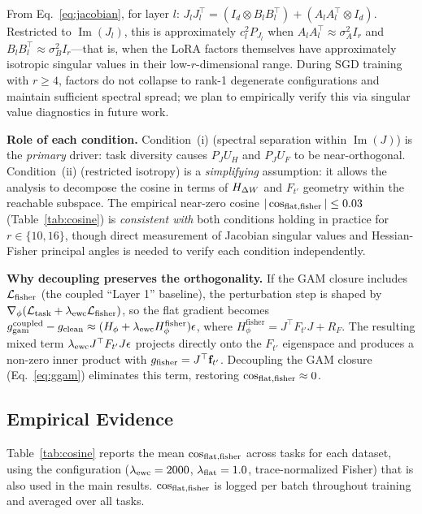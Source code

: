 From Eq.~\eqref{eq:jacobian}, for layer $l$:
$J_l J_l^\top = (I_d\otimes B_lB_l^\top) + (A_lA_l^\top\otimes I_d)$.
Restricted to $\operatorname{Im}(J_l)$, this is approximately $c_l^2 P_{J_l}$ when
$A_lA_l^\top\approx\sigma_A^2 I_r$ and $B_lB_l^\top\approx\sigma_B^2 I_r$---that is,
when the LoRA factors themselves have approximately isotropic singular values
in their low-$r$-dimensional range.
During SGD training with $r \geq 4$, factors do not collapse to rank-1 degenerate configurations
and maintain sufficient spectral spread; we plan to empirically verify this via singular value
diagnostics in future work.

\textbf{Role of each condition.}
Condition~(i) (spectral separation within $\operatorname{Im}(J)$) is the \emph{primary} driver:
task diversity causes $P_J U_H$ and $P_J U_F$ to be near-orthogonal.
Condition~(ii) (restricted isotropy) is a \emph{simplifying} assumption:
it allows the analysis to decompose the cosine in terms of $H_{\Delta W}$ and $F_{t'}$ geometry
within the reachable subspace.
The empirical near-zero cosine $|\cos_{\mathrm{flat,fisher}}| \leq 0.03$ (Table~\ref{tab:cosine}) is
\emph{consistent with} both conditions holding in practice for $r\in\{10,16\}$,
though direct measurement of Jacobian singular values and Hessian-Fisher principal angles
is needed to verify each condition independently.

\textbf{Why decoupling preserves the orthogonality.}
If the GAM closure includes $\mathcal{L}_{\mathrm{fisher}}$ (the coupled ``Layer 1'' baseline),
the perturbation step is shaped by $\nabla_\phi(\mathcal{L}_{\mathrm{task}} + \lambda_{\mathrm{ewc}}\mathcal{L}_{\mathrm{fisher}})$,
so the flat gradient becomes
$g_{\mathrm{gam}}^\mathrm{coupled} - g_{\mathrm{clean}} \approx (H_\phi + \lambda_{\mathrm{ewc}} H_\phi^\mathrm{fisher})\epsilon$,
where $H_\phi^\mathrm{fisher} = J^\top F_{t'} J + R_F$.
The resulting mixed term $\lambda_{\mathrm{ewc}} J^\top F_{t'} J\epsilon$ projects directly onto the
$F_{t'}$ eigenspace and produces a non-zero inner product with $g_{\mathrm{fisher}} = J^\top\mathbf{f}_{t'}$.
Decoupling the GAM closure (Eq.~\eqref{eq:ggam}) eliminates this term,
restoring $\cos_{\mathrm{flat,fisher}}\approx 0$.

\subsection{Empirical Evidence}
\label{sec:cosine_evidence}

Table~\ref{tab:cosine} reports the mean $\cos_{\mathrm{flat,fisher}}$ across tasks for each dataset,
using the configuration ($\lambda_{\mathrm{ewc}}=2000$, $\lambda_{\mathrm{flat}}=1.0$, trace-normalized Fisher)
that is also used in the main results.
$\cos_{\mathrm{flat,fisher}}$ is logged per batch throughout training and averaged over all tasks.

